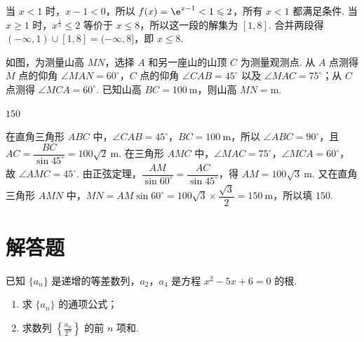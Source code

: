 \begin{solution}
当 \(x<1\) 时，\(x-1<0\)，所以 \(f(x)=\e^{x-1}<1\leqslant2\)，所有 \(x<1\) 都满足条件. 当 \(x\geqslant1\) 时，\(x^{\frac{1}{3}}\leqslant2\) 等价于 \(x\leqslant8\)，所以这一段的解集为 \([1,8]\). 合并两段得 \((-\infty,1)\cup[1,8]=(-\infty,8]\)，即 \(x\leqslant8\).
\end{solution}

\begin{problem}
如图，为测量山高 \(MN\)，选择 \(A\) 和另一座山的山顶 \(C\) 为测量观测点. 从 \(A\) 点测得 \(M\) 点的仰角 \(\angle MAN = 60^\circ\)，\(C\) 点的仰角 \(\angle CAB = 45^\circ\) 以及 \(\angle MAC = 75^\circ\)；从 \(C\) 点测得 \(\angle MCA = 60^\circ\). 已知山高 \(BC = 100 \mathrm{~m}\)，则山高 \(MN =\)\fillinblank{}\(\mathrm{m}\).

\end{problem}

\begin{answer}
\(150\)
\end{answer}

\begin{solution}
在直角三角形 \(ABC\) 中，\(\angle CAB=45^\circ\)，\(BC=100\mathrm{~m}\)，所以 \(\angle ABC=90^\circ\)，且 \(AC=\dfrac{BC}{\sin45^\circ}=100\sqrt{2}\mathrm{~m}\). 在三角形 \(AMC\) 中，\(\angle MAC=75^\circ\)，\(\angle MCA=60^\circ\)，故 \(\angle AMC=45^\circ\). 由正弦定理，\(\dfrac{AM}{\sin60^\circ}=\dfrac{AC}{\sin45^\circ}\)，得 \(AM=100\sqrt{3}\mathrm{~m}\). 又在直角三角形 \(AMN\) 中，\(MN=AM\sin60^\circ=100\sqrt{3}\times\dfrac{\sqrt{3}}{2}=150\mathrm{~m}\)，所以填 \(150\).
\end{solution}

\section{解答题}

\begin{problem}
已知 \(\{a_{n}\}\) 是递增的等差数列，\(a_{2}\)，\(a_{4}\) 是方程 \(x^{2} - 5x + 6 = 0\) 的根.

\begin{enumerate}
\item 求 \(\{a_{n}\}\) 的通项公式；
\item 求数列 \(\left\{\frac{a_{n}}{2^{n}}\right\}\) 的前 \(n\) 项和.
\end{enumerate}
\end{problem}

